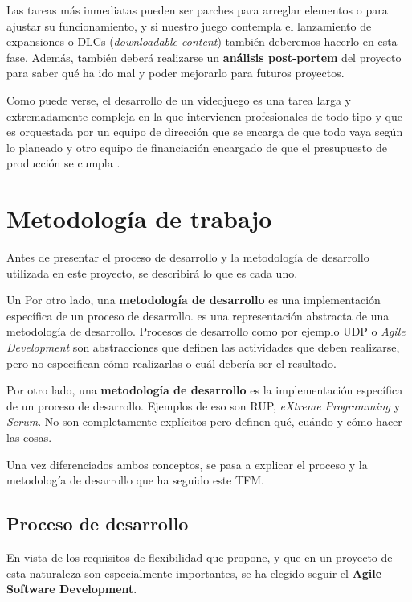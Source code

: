 Las tareas más inmediatas pueden ser parches para arreglar elementos o para ajustar su funcionamiento, y si nuestro juego contempla el lanzamiento de expansiones o DLCs (\textit{downloadable content}) también deberemos hacerlo en esta fase. Además, también deberá realizarse un \textbf{análisis post-portem} del proyecto para saber qué ha ido mal y poder mejorarlo para futuros proyectos.

Como puede verse, el desarrollo de un videojuego es una tarea larga y extremadamente compleja en la que intervienen profesionales de todo tipo y que es orquestada por un equipo de dirección que se encarga de que todo vaya según lo planeado y otro equipo de financiación encargado de que el presupuesto de producción se cumpla \cite{man-14}.

\section{Metodología de trabajo}

Antes de presentar el proceso de desarrollo y la metodología de desarrollo utilizada en este proyecto, se describirá lo que es cada uno.

Un Por otro lado, una \textbf{metodología de desarrollo} es una implementación específica de un proceso de desarrollo. es una representación abstracta de una metodología de desarrollo. Procesos de desarrollo como por ejemplo \acs{UDP} o \textit{Agile Development} son abstracciones que definen las actividades que deben realizarse, pero no especifican cómo realizarlas o cuál debería ser el resultado.

Por otro lado, una \textbf{metodología de desarrollo} es la implementación específica de un proceso de desarrollo. Ejemplos de eso son \acs{RUP}, \textit{eXtreme Programming} y \textit{Scrum}. No son completamente explícitos pero definen qué, cuándo y cómo hacer las cosas.

Una vez diferenciados ambos conceptos, se pasa a explicar el proceso y la metodología de desarrollo que ha seguido este \acs{TFM}.

\subsection{Proceso de desarrollo}

En vista de los requisitos de flexibilidad que propone, y que en un proyecto de esta naturaleza son especialmente importantes, se ha elegido seguir el \textbf{Agile Software Development}.

